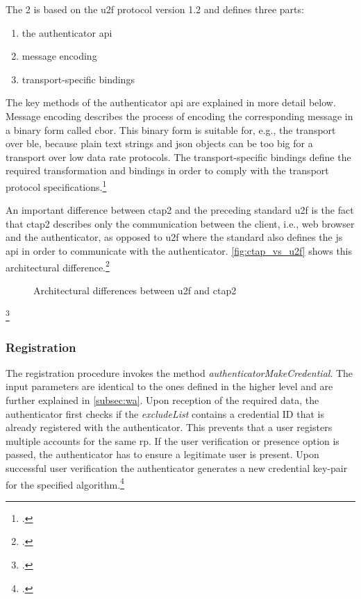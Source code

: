 The  2 is based on the \gls{u2f} protocol version 1.2 and defines three parts:

\begin{enumerate}
	\item the authenticator \gls{api}
	\item message encoding
	\item transport-specific bindings
\end{enumerate}

The key methods of the authenticator \gls{api} are explained in more detail below. Message encoding describes the process of encoding the corresponding message in a binary form called \gls{cbor}. This binary form is suitable for, e.g., the transport over \gls{ble}, because plain text strings and \gls{json} objects can be too big for a transport over low data rate protocols. The transport-specific bindings define the required transformation and bindings in order to comply with the transport protocol specifications.\footcites[See][4--5]{ctap2}

An important difference between \gls{ctap}2 and the preceding standard \gls{u2f} is the fact that \gls{ctap}2 describes only the communication between the client, i.e., web browser and the authenticator, as opposed to \gls{u2f} where the standard also defines the \gls{js} \gls{api} in order to communicate with the authenticator. \autoref{fig:ctap_vs_u2f} shows this architectural difference.\footcites[See][51]{kim-new-way-fido}[See][254]{Schwartz2018}

\begin{figure}[hbt]
	\centering
	
	\caption[Architectural differences between \gls{u2f} and \gls{ctap}2]{Architectural differences between \gls{u2f} and \gls{ctap}2\footnotemark}
	\label{fig:ctap_vs_u2f}
\end{figure}
\footcitetexts[Source: diagram by author, based on][4]{u2f-overview}[][Chapter 6]{w3c}

\newpage

\subsubsection{Registration}

The registration procedure invokes the method \textit{authenticatorMakeCredential}. The input parameters are identical to the ones defined in the higher level \wa{} and are further explained in \autoref{subsec:wa}. Upon reception of the required data, the authenticator first checks if the \textit{excludeList} contains a credential ID that is already registered with the authenticator. This prevents that a user registers multiple accounts for the same \gls{rp}. If the user verification or presence option is passed, the authenticator has to ensure a legitimate user is present. Upon successful user verification the authenticator generates a new credential key-pair for the specified algorithm.\footcites[See][9]{ctap2}

